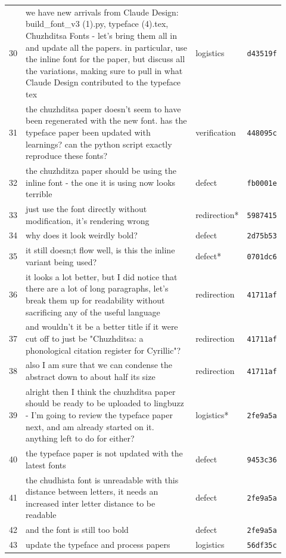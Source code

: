 \begin{longtable}{@{}p{0.04\linewidth}p{0.66\linewidth}p{0.13\linewidth}p{0.09\linewidth}@{}}
\midrule
30 & we have new arrivals from Claude Design: build\_font\_v3 (1).py, typeface (4).tex, Chuzhditsa Fonts - let's bring them all in and update all the papers. in particular, use the inline font for the paper, but discuss all the variations, making sure to pull in what Claude Design contributed to the typeface tex & logistics & \texttt{d43519f} \\
31 & the chuzhditsa paper doesn't seem to have been regenerated with the new font. has the typeface paper been updated with learnings? can the python script exactly reproduce these fonts? & verification & \texttt{448095c} \\
32 & the chuzhditza paper should be using the inline font - the one it is using now looks terrible & defect & \texttt{fb0001e} \\
33 & just use the font directly without modification, it's rendering wrong & redirection* & \texttt{5987415} \\
34 & why does it look weirdly bold? & defect & \texttt{2d75b53} \\
35 & it still doesn;t flow well, is this the inline variant being used? & defect* & \texttt{0701dc6} \\
36 & it looks a lot better, but I did notice that there are a lot of long paragraphs, let's break them up for readability without sacrificing any of the useful language & redirection & \texttt{41711af} \\
37 & and wouldn't it be a better title if it were cut off to just be "Chuzhditsa: a phonological citation register for Cyrillic"? & redirection & \texttt{41711af} \\
38 & also I am sure that we can condense the abstract down to about half its size & redirection & \texttt{41711af} \\
39 & alright then I think the chuzhditsa paper should be ready to be uploaded to lingbuzz - I'm going to review the typeface paper next, and am already started on it. anything left to do for either? & logistics* & \texttt{2fe9a5a} \\
40 & the typeface paper is not updated with the latest fonts & defect & \texttt{9453c36} \\
41 & the chudhista font is unreadable with this distance between letters, it needs an increased inter letter distance to be readable & defect & \texttt{2fe9a5a} \\
42 & and the font is still too bold & defect & \texttt{2fe9a5a} \\
43 & update the typeface and process papers & logistics & \texttt{56df35c} \\

\end{longtable}
